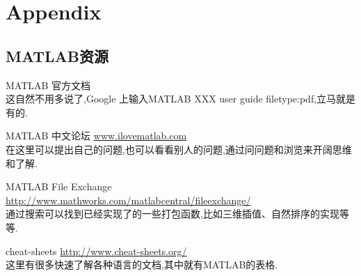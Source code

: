 \appendix
\section{Appendix}

\subsection{MATLAB资源}
\begin{itemize*}    
    \item MATLAB 官方文档\\
          这自然不用多说了,Google 上输入MATLAB XXX user guide
          filetype:pdf,立马就是有的.        
    \item MATLAB 中文论坛 \url{www.ilovematlab.com}\\
          在这里可以提出自己的问题,也可以看看别人的问题,通过问问题和浏览来开阔思维和了解.                  
    \item MATLAB File Exchange 
                      \url{http://www.mathworks.com/matlabcentral/fileexchange/}\\
          通过搜索可以找到已经实现了的一些打包函数,比如三维插值、自然排序的实现等等.
    \item cheat-sheets \url{http://www.cheat-sheets.org/}\\
          这里有很多快速了解各种语言的文档,其中就有MATLAB的表格.
\end{itemize*}